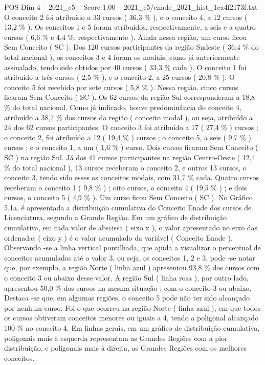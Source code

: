 \begin{textsample}{POS Dim 4 – 2021\_c5 – Score 1.00 – 2021\_c5/enade\_2021\_hist\_1ca4f2173f.txt}
O conceito 2 foi atribuído a 33 cursos ( 36,3 \% ), e o conceito 4, a 12 cursos ( 13,2 \% ).
Os conceitos 1 e 5 foram atribuídos, respectivamente, a seis e a quatro cursos ( 6,6 \% e 4,4 \%, respectivamente ).
Ainda nessa região, um curso ficou Sem Conceito ( SC ).
Dos 120 cursos participantes da região Sudeste ( 36,4 \% do total nacional ), os conceitos 3 e 4 foram os modais, como já anteriormente assinalado, tendo sido obtidos por 40 cursos ( 33,3 \% cada ).
O conceito 1 foi atribuído a três cursos ( 2,5 \% ), e o conceito 2, a 25 cursos ( 20,8 \% ).
O conceito 5 foi recebido por sete cursos ( 5,8 \% ).
Nessa região, cinco cursos ficaram Sem Conceito ( SC ).
Os 62 cursos da região Sul corresponderam a 18,8 \% do total nacional.
Como já indicado, houve predominância do conceito 4, atribuído a 38,7 \% dos cursos da região ( conceito modal ), ou seja, atribuído a 24 dos 62 cursos participantes.
O conceito 3 foi atribuído a 17 ( 27,4 \% ) cursos ; o conceito 2, foi atribuído a 12 ( 19,4 \% ) cursos ; o conceito 5, a seis ( 9,7 \% ) cursos ; e o conceito 1, a um ( 1,6 \% ) curso.
Dois cursos ficaram Sem Conceito ( SC ) na região Sul.
Já dos 41 cursos participantes na região Centro-Oeste ( 12,4 \% do total nacional ), 13 cursos receberam o conceito 2, e outros 13 cursos, o conceito 3, tendo sido esses os conceitos modais, com 31,7 \% cada.
Quatro cursos receberam o conceito 1 ( 9,8 \% ) ; oito cursos, o conceito 4 ( 19,5 \% ) ; e dois cursos, o conceito 5 ( 4,9 \% ).
Um curso ficou Sem Conceito ( SC ).
No Gráfico 5.1a, é apresentada a distribuição cumulativa do Conceito Enade dos cursos de Licenciatura, segundo a Grande Região.
Em um gráfico de distribuição cumulativa, em cada valor de abscissa ( eixo x ), o valor apresentado no eixo das ordenadas ( eixo y ) é o valor acumulado da variável ( Conceito Enade ).
Observando -se a linha vertical pontilhada, que ajuda a visualizar o percentual de conceitos acumulados até o valor 3, ou seja, os conceitos 1, 2 e 3, pode -se notar que, por exemplo, a região Norte ( linha azul ) apresentou 93,8 \% dos cursos com o conceito 3 ou abaixo desse valor.
A região Sul ( linha rosa ), por outro lado, apresentou 50,0 \% dos cursos na mesma situação : com o conceito 3 ou abaixo.
Destaca -se que, em algumas regiões, o conceito 5 pode não ter sido alcançado por nenhum curso.
Foi o que ocorreu na região Norte ( linha azul ), em que todos os cursos obtiveram conceitos menores ou iguais a 4, tendo a poligonal alcançado 100 \% no conceito 4.
Em linhas gerais, em um gráfico de distribuição cumulativa, poligonais mais à esquerda representam as Grandes Regiões com a pior distribuição, e poligonais mais à direita, as Grandes Regiões com os melhores conceitos.

\end{textsample}
